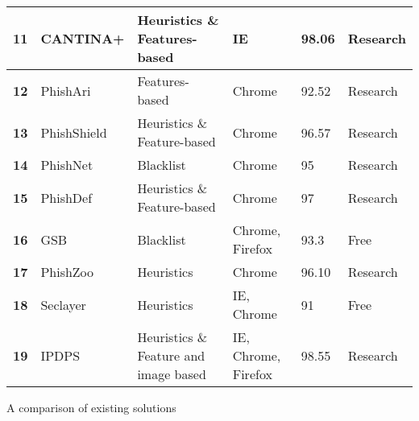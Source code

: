 \begin{center}
\begin{tabular}{ | m{0.9em} | m{7.6em} | m{13em} | m{7.1em} | m{2.3em} | m{4.3em} | }
		\hline
		\multicolumn{1}{|c|}{\textbf{11}} & CANTINA+                     & Heuristics \& Features-based          & IE                  & 98.06           & Research               \\
		\hline
		\multicolumn{1}{|c|}{\textbf{12}} & PhishAri                     & Features-based                        & Chrome              & 92.52           & Research               \\
		\hline
		\multicolumn{1}{|c|}{\textbf{13}} & PhishShield                  & Heuristics \& Feature-based           & Chrome              & 96.57           & Research               \\
		\hline
		\multicolumn{1}{|c|}{\textbf{14}} & PhishNet                     & Blacklist                             & Chrome              & 95              & Research               \\
		\hline
		\multicolumn{1}{|c|}{\textbf{15}} & PhishDef                     & Heuristics \& Feature-based           & Chrome              & 97              & Research               \\
		\hline
		\multicolumn{1}{|c|}{\textbf{16}} & GSB                          & Blacklist                             & Chrome, Firefox     & 93.3            & Free                   \\
		\hline
		\multicolumn{1}{|c|}{\textbf{17}} & PhishZoo                     & Heuristics                            & Chrome              & 96.10           & Research               \\
		\hline
		\multicolumn{1}{|c|}{\textbf{18}} & Seclayer                     & Heuristics                            & IE, Chrome          & 91              & Free                   \\
		\hline
		\multicolumn{1}{|c|}{\textbf{19}} & IPDPS                        & Heuristics \& Feature and image based & IE, Chrome, Firefox & 98.55           & Research               \\
		\hline
	\end{tabular}
	\captionsetup{type=table}\caption{A comparison of existing solutions \citep{Adebowale}}
\end{center}

